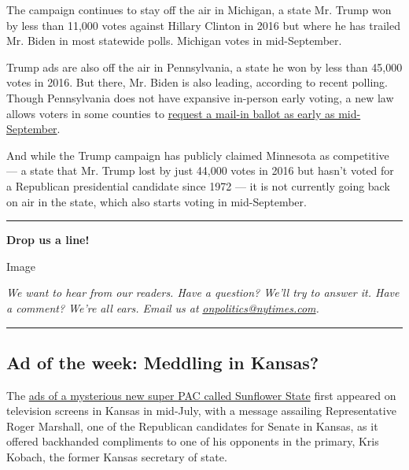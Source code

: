 The campaign continues to stay off the air in Michigan, a state Mr.
Trump won by less than 11,000 votes against Hillary Clinton in 2016 but
where he has trailed Mr. Biden in most statewide polls. Michigan votes
in mid-September.

Trump ads are also off the air in Pennsylvania, a state he won by less
than 45,000 votes in 2016. But there, Mr. Biden is also leading,
according to recent polling. Though Pennsylvania does not have expansive
in-person early voting, a new law allows voters in some counties to
\href{https://www.inquirer.com/politics/election/pennsylvania-early-voting-absentee-ballots-20200113.html}{request
a mail-in ballot as early as mid-September}.

And while the Trump campaign has publicly claimed Minnesota as
competitive --- a state that Mr. Trump lost by just 44,000 votes in 2016
but hasn't voted for a Republican presidential candidate since 1972 ---
it is not currently going back on air in the state, which also starts
voting in mid-September.

\begin{center}\rule{0.5\linewidth}{\linethickness}\end{center}

\textbf{Drop us a line!}

Image

\emph{We want to hear from our readers. Have a question? We'll try to
answer it. Have a comment? We're all ears. Email us at}
\href{mailto:onpolitics@nytimes.com}{\emph{onpolitics@nytimes.com}}\emph{.}

\begin{center}\rule{0.5\linewidth}{\linethickness}\end{center}

\hypertarget{ad-of-the-week-meddling-in-kansas}{%
\subsection{Ad of the week: Meddling in
Kansas?}\label{ad-of-the-week-meddling-in-kansas}}

The \href{https://twitter.com/greggiroux/status/1288089119529283585}{ads
of a mysterious new super PAC called Sunflower State} first appeared on
television screens in Kansas in mid-July, with a message assailing
Representative Roger Marshall, one of the Republican candidates for
Senate in Kansas, as it offered backhanded compliments to one of his
opponents in the primary, Kris Kobach, the former Kansas secretary of
state.

